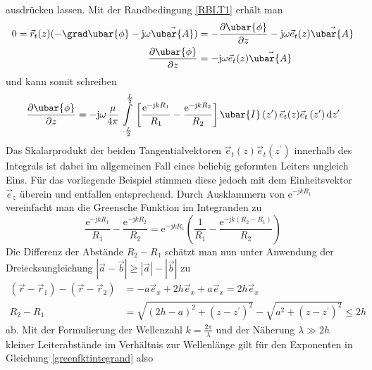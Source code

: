 ausdrücken lassen. Mit der Randbedingung \ref{RBLT1} erhält man
\begin{equation}\begin{split}
	0=\vec{r}_{t}(z)(-\grad \ubar{\phi}-\mathrm{j} \omega \vec{\ubar{A}}) & =-\frac{\partial \ubar{\phi}}{\partial z}-\mathrm{j} \omega \vec{e}_{t}(z) \vec{\ubar{A}}  \\
	\frac{\partial \ubar{\phi}}{\partial z} & =-\mathrm{j} \omega \vec{e}_{t}(z) \vec{\ubar{A}} 
\end{split}\end{equation}
und kann somit schreiben
\begin{equation}\label{LTglsomit}
	\frac{\partial \ubar{\phi}}{\partial z}=-\mathrm{j} \omega \frac{\mu}{4 \pi} \int\limits_{-\frac{L}{2}}^{\frac{L}{2}}\left[\frac{\mathrm{e}^{-\mathrm{j} k R_{1}}}{R_{1}}-\frac{\mathrm{e}^{-\mathrm{j} k R_{2}}}{R_{2}}\right] \ubar{I}\left(z^{\prime}\right) \vec{e}_{t}(z) \vec{e}_{t}\left(z^{\prime}\right) \mathrm{d} z^{\prime} 
\end{equation}
Das Skalarprodukt der beiden Tangentialvektoren $\vec{e}_{t}(z) \vec{e}_{t}\left(z^{\prime}\right)$ innerhalb des Integrals ist dabei im allgemeinen Fall eines beliebig geformten Leiters ungleich Eins. Für das vorliegende Beispiel stimmen diese jedoch mit dem Einheitsvektor $\vec{e}_{z}$ überein und entfallen entsprechend. Durch Ausklammern von $\mathrm{e}^{-\mathrm{j} k R_{1}}$ vereinfacht man die Greensche Funktion im Integranden zu
\begin{equation}\label{greenfktintegrand}
	\frac{\mathrm{e}^{-\mathrm{j} k R_{1}}}{R_{1}}-\frac{\mathrm{e}^{-\mathrm{j} k R_{2}}}{R_{2}}=\mathrm{e}^{-\mathrm{j} k R_{1}}\left(\frac{1}{R_{1}}-\frac{\mathrm{e}^{-\mathrm{j} k\left(R_{2}-R_{1}\right)}}{R_{2}}\right) 
\end{equation}
Die Differenz der Abstände $R_{2}-R_{1}$ schätzt man nun unter Anwendung der Dreiecksungleichung $|\vec{a}-\vec{b}| \geq|\vec{a}|-|\vec{b}|$ zu
\begin{equation}
\begin{split}
	\left(\vec{r}-\vec{r}_{1}\right)-\left(\vec{r}-\vec{r}_{2}\right) & =-a \vec{e}_{x}+2 h \vec{e}_{x}+a \vec{e}_{x}=2 h \vec{e}_{x}  \\
	R_{2}-R_{1} & =\sqrt{(2 h-a)^{2}+\left(z-z^{\prime}\right)^{2}}-\sqrt{a^{2}+\left(z-z^{\prime}\right)^{2}} \leq 2 h 
\end{split}
\end{equation}
ab. Mit der Formulierung der Wellenzahl $k=\frac{2 \pi}{\lambda}$ und der Näherung $\lambda \gg 2 h$ kleiner Leiterabstände im Verhältnis zur Wellenlänge gilt für den Exponenten in Gleichung \ref{greenfktintegrand} also
